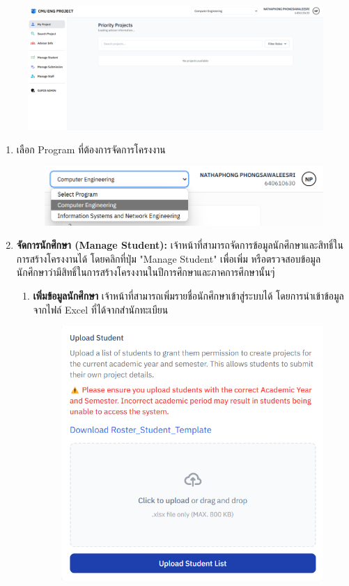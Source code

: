 \begin{itemize}
\begin{figure}[H]
    \includegraphics[width=130mm, keepaspectratio ]{pictures/project_box/program_admin_dashboard.png}
\end{figure}
\begin{enumerate}
    \item เลือก Program ที่ต้องการจัดการโครงงาน
    \begin{figure}[H]
        \centering
        \includegraphics[width=130mm, keepaspectratio ]{pictures/project_box/select_program_before_manage.png}
    \end{figure}
    \item \textbf{จัดการนักศึกษา (Manage Student): } เจ้าหน้าที่สามารถจัดการข้อมูลนักศึกษาและสิทธิ์ในการสร้างโครงงานได้ โดยคลิกที่ปุ่ม "Manage Student" เพื่อเพิ่ม หรือตรวจสอบข้อมูลนักศึกษาว่ามีสิทธิ์ในการสร้างโครงงานในปีการศึกษาและภาคการศึกษานั้นๆ่
    \begin{enumerate}
        \item \textbf{เพิ่มข้อมูลนักศึกษา} เจ้าหน้าที่สามารถเพิ่มรายชื่อนักศึกษาเข้าสู่ระบบได้ โดยการนำเข้าข้อมูลจากไฟล์ Excel ที่ได้จากสำนักทะเบียน
        \begin{figure}[H]
            \centering
            \includegraphics[width=100mm, keepaspectratio ]{pictures/project_box/add_new_student.png}

\end{figure}
\end{enumerate}
\end{enumerate}
\end{itemize}

